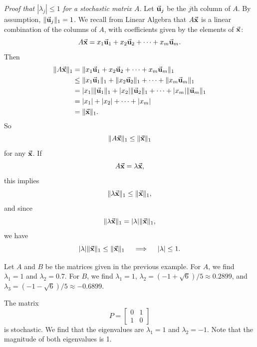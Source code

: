 \emph{Proof that $|\lambda_j|\le 1$ for a stochastic matrix $A$.}
Let $\vec{\textbf{u}}_j$ be the $j$th column of $A$.
By assumption, $\|\vec{\textbf{u}}_j\|_1 = 1$.
We recall from Linear Algebra that
$A\vec{\textbf{x}}$ is a linear combination of the columns of $A$, with
coefficients given by the elements of $\vec{\textbf{x}}$:
\begin{equation}
  A\vec{\textbf{x}} = x_1 \vec{\textbf{u}}_1 + x_2\vec{\textbf{u}}_2 + \cdots + x_m \vec{\textbf{u}}_m.
\end{equation}
Then
\begin{equation}
\begin{split}
  \|A\vec{\textbf{x}}\|_1 & = \|x_1\vec{\textbf{u}}_1 + x_2 \vec{\textbf{u}}_2 + \cdots + x_m\vec{\textbf{u}}_m\|_1 \\
             & \le \|x_1 \vec{\textbf{u}}_1\|_1 + \|x_2 \vec{\textbf{u}}_2\|_1 + \cdots + \| x_m \vec{\textbf{u}}_m\|_1 \\
	     & = |x_1|\|\vec{\textbf{u}}_1\|_1 + |x_2|\|\vec{\textbf{u}}_2\|_1 + \cdots + |x_m|\|\vec{\textbf{u}}_m\|_1 \\
	     & = |x_1| + |x_2| + \cdots + |x_m| \\
	     & = \|\vec{\textbf{x}}\|_1.
\end{split}
\end{equation}
So
\begin{equation}
\|A\vec{\textbf{x}}\|_1 \le \|\vec{\textbf{x}}\|_1
\end{equation}
for any $\vec{\textbf{x}}$.  If
\begin{equation}
  A\vec{\textbf{x}} = \lambda \vec{\textbf{x}},
\end{equation}
this implies
\begin{equation}
  \|\lambda\vec{\textbf{x}}\|_1 \le \|\vec{\textbf{x}}\|_1,
\end{equation}
and since
\begin{equation}
  \|\lambda \vec{\textbf{x}}\|_1 = |\lambda|\|\vec{\textbf{x}}\|_1,
\end{equation}
we have
\begin{equation}
 |\lambda| \|\vec{\textbf{x}}\|_1 \le \|\vec{\textbf{x}}\|_1
 \quad
 \implies
 \quad
 |\lambda| \le 1.
\end{equation}
\begin{xexample}
Let $A$ and $B$ be the matrices given in the previous example.
For $A$, we find $\lambda_1 = 1$ and $\lambda_2 = 0.7$.
For $B$, we find $\lambda_1 = 1$,
$\lambda_2 = (-1+\sqrt{6})/5 \approx 0.2899$,
and $\lambda_3 = (-1-\sqrt{6})/5 \approx -0.6899$.
\end{xexample}
\begin{xexample}
The matrix
\begin{equation}
  P = \begin{bmatrix}
          0 & 1 \\
	  1 & 0
      \end{bmatrix}
\end{equation}
is stochastic. We find that the eigenvalues
are $\lambda_1 = 1$ and $\lambda_2 = -1$.
Note that the magnitude of both eigenvalues is 1.
\end{xexample}
%
\newpage
%
